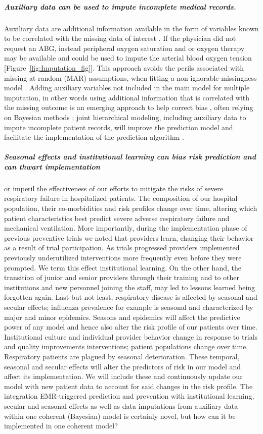 \documentclass[11pt,notitlepage]{article}
\begin{document}
\subparagraph*{Auxiliary data can be used to impute incomplete medical records.} Auxiliary data are additional information available in the form of variables known to be correlated with the missing data of interest \cite{Daniels24571539}. If the physician did not request an ABG, instead peripheral oxygen saturation and or oxygen therapy may be available and could be used to impute the arterial blood oxygen tension [Figure~\ref{fig:Imputation_fig}]. This approach avoids the perils associated with missing at random (MAR) assumptions, when fitting a non-ignorable missingness model \cite{Wang_20029935}. Adding auxiliary variables not included in the main model for multiple imputation, in other words using additional information that is correlated with the missing outcome is an emerging approach to help correct bias \cite{Meng_1994, Collins_11778676, Rubin_1996}, often relying on Bayesian methods \cite{Daniels_2008, Schafer_1997}; joint hierarchical modeling, including auxiliary data to impute incomplete patient records, will improve the prediction model and facilitate the implementation of the prediction algorithm \cite{Hall_25389642}.


\subparagraph*{Seasonal effects and institutional learning can bias risk prediction and can thwart implementation} or imperil the effectiveness of our efforts to mitigate the risks of severe respiratory failure in hospitalized patients. The composition of our hospital population, their co-morbidities and risk profiles change over time, altering which patient characteristics best predict severe adverse respiratory failure and mechanical ventilation. More importantly,  during the implementation phase of previous preventive trials we noted that providers learn, changing their behavior as a result of trial participation. As trials progressed providers implemented previously underutilized interventions more frequently even before they were prompted. We term this effect institutional learning. On the other hand, the transition of junior and senior providers through their training and to other institutions and new personnel joining the staff, may led to lessons learned being forgotten again. Last but not least, respiratory disease is affected by seasonal and secular effects; influenza prevalence for example is seasonal and characterized by major and minor epidemics. Seasons and epidemics will affect the predictive power of any model and hence also alter the risk profile of our patients over time. Institutional culture and individual provider behavior change in response to trials and quality improvements interventions; patient populations change over time. Respiratory patients are plagued by seasonal deterioration. These temporal, seasonal and secular effects will alter the predictors of risk in our model and affect its implementation. We will include these and continuously update our model with new patient data to account for said changes in the risk profile. The integration EMR-triggered prediction and prevention with  institutional learning, secular and seasonal effects as well as data imputations from auxiliary data within one coherent (Bayesian) model is certainly novel, but how can it be implemented in one coherent model? 
\end{document}
